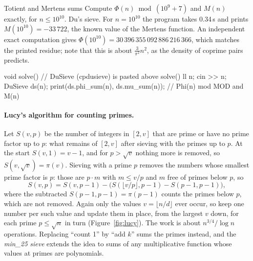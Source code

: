 
\begin{problem}{Totient and Mertens sums}
Compute $\Phi(n) \bmod (10^9 + 7)$ and $M(n)$ exactly, for $n \le 10^{10}$.
\solution Du's sieve. For $n = 10^{10}$ the program takes 0.34\,s and prints $M(10^{10}) = -33\,722$, the known value of the Mertens
function. An independent exact computation gives $\Phi(10^{10}) = 30\,396\,355\,092\,886\,216\,366$, which matches the printed
residue; note that this is about $\frac{3}{\pi^2} n^2$, as the density of coprime pairs predicts.
\end{problem}

\begin{code}
void solve() {  // DuSieve (cpdusieve) is pasted above solve()
    ll n;
    cin >> n;
    DuSieve ds(n);
    print(ds.phi_sum(n), ds.mu_sum(n));  // Phi(n) mod MOD and M(n)
}
\end{code}

\paragraph{Lucy's algorithm for counting primes.} Let $S(v, p)$ be the number of integers in $[2, v]$ that are prime or have no prime
factor up to $p$: what remains of $[2, v]$ after sieving with the primes up to $p$. At the start $S(v, 1) = v - 1$, and for $p > \sqrt
v$ nothing more is removed, so $S(v, \sqrt v) = \pi(v)$. Sieving with a prime $p$ removes the numbers whose smallest prime factor is $p$:
those are $p \cdot m$ with $m \le v/p$ and $m$ free of primes below $p$, so
\[
  S(v, p) = S(v, p - 1) - \bigl(S(\lfloor v/p \rfloor, p - 1) - S(p - 1, p - 1)\bigr),
\]
where the subtracted $S(p - 1, p - 1) = \pi(p - 1)$ counts the primes below $p$, which are not removed. Again only the values $v =
\lfloor n/d \rfloor$ ever occur, so keep one number per such value and update them in place, from the largest $v$ down, for each prime
$p \le \sqrt n$ in turn (Figure~\ref{fig:lucy}). The work is about $n^{3/4}/\log n$ operations. Replacing ``count 1'' by ``add $k$''
sums the primes instead, and the \emph{min\_25 sieve} extends the idea to sums of any multiplicative function whose values at primes are
polynomials.

